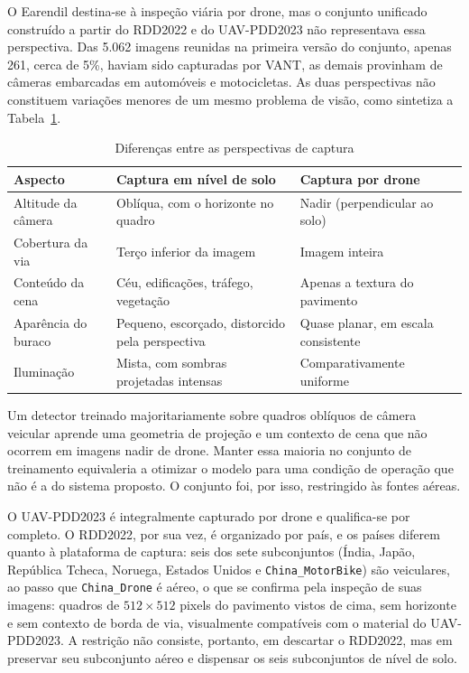 \documentclass[12pt]{article}
\newcommand{\fonte}[1]{%
  \vspace{2pt}\par\noindent{\footnotesize Fonte: #1}}
\begin{document}
O Earendil destina-se à inspeção viária por drone, mas o conjunto
unificado construído a partir do RDD2022 e do UAV-PDD2023 não
representava essa perspectiva. Das 5.062 imagens reunidas na primeira
versão do conjunto, apenas 261, cerca de 5\%, haviam sido capturadas por
VANT, as demais provinham de câmeras embarcadas em automóveis e
motocicletas. As duas perspectivas não constituem variações menores de um
mesmo problema de visão, como sintetiza a Tabela~\ref{tab:perspectivas}.

\begin{table}[ht]
\centering
\caption{Diferenças entre as perspectivas de captura}
\label{tab:perspectivas}
\small
\setlength{\tabcolsep}{4pt}
\renewcommand{\arraystretch}{1.15}
\begin{tabular}{p{2.9cm} p{5.3cm} p{4.4cm}}
\hline
\textbf{Aspecto} & \textbf{Captura em nível de solo} &
\textbf{Captura por drone} \\
\hline
Altitude da câmera & Oblíqua, com o horizonte no quadro &
Nadir (perpendicular ao solo) \\
Cobertura da via & Terço inferior da imagem & Imagem inteira \\
Conteúdo da cena & Céu, edificações, tráfego, vegetação &
Apenas a textura do pavimento \\
Aparência do buraco & Pequeno, escorçado, distorcido pela perspectiva &
Quase planar, em escala consistente \\
Iluminação & Mista, com sombras projetadas intensas &
Comparativamente uniforme \\
\hline
\end{tabular}
\fonte{elaborado pelo autor, 2026.}
\end{table}

Um detector treinado majoritariamente sobre quadros oblíquos de câmera
veicular aprende uma geometria de projeção e um contexto de cena que não
ocorrem em imagens nadir de drone. Manter essa maioria no conjunto de
treinamento equivaleria a otimizar o modelo para uma condição de operação
que não é a do sistema proposto. O conjunto foi, por isso, restringido às
fontes aéreas.

O UAV-PDD2023 é integralmente capturado por drone e qualifica-se por
completo. O RDD2022, por sua vez, é organizado por país, e os países
diferem quanto à plataforma de captura: seis dos sete subconjuntos
(Índia, Japão, República Tcheca, Noruega, Estados Unidos e
\texttt{China\_MotorBike}) são veiculares, ao passo que
\texttt{China\_Drone} é aéreo, o que se confirma pela inspeção de suas
imagens: quadros de $512 \times 512$ pixels do pavimento vistos de cima,
sem horizonte e sem contexto de borda de via, visualmente compatíveis com
o material do UAV-PDD2023. A restrição não consiste, portanto, em
descartar o RDD2022, mas em preservar seu subconjunto aéreo e dispensar
os seis subconjuntos de nível de solo.
\end{document}
